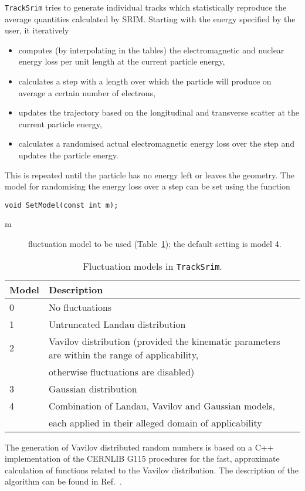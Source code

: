 \texttt{TrackSrim} tries to generate individual tracks which statistically 
reproduce the average quantities calculated by SRIM.
Starting with the energy specified by the user, it iteratively
\begin{itemize}
\item
computes (by interpolating in the tables)  
the electromagnetic and nuclear energy loss per unit length at the 
current particle energy,
\item
calculates a step with a length over which the particle will 
produce on average a certain number of electrons,
\item
updates the trajectory based on the longitudinal and transverse scatter 
at the current particle energy,
\item 
calculates a randomised actual electromagnetic energy loss over the step 
and updates the particle energy.
\end{itemize}
This is repeated until the particle has no energy left or leaves the geometry.
The model for randomising the energy loss over a step can be set using 
the function 
\begin{lstlisting}
void SetModel(const int m);
\end{lstlisting}
\begin{description}
\item[m] fluctuation model to be used (Table~\ref{Tab:SrimFluctuationModels}); the default setting is model 4.
\end{description}
\begin{table}
  \centering
  \caption{Fluctuation models in \texttt{TrackSrim}.}
  \label{Tab:SrimFluctuationModels}
  \begin{tabular}{l l}
    \toprule
    Model & Description \\
    \midrule
    0 & No fluctuations \\
    1 & Untruncated Landau distribution \\
    2 & Vavilov distribution (provided the kinematic parameters are within the range of applicability, \\
      & otherwise fluctuations are disabled) \\
    3 & Gaussian distribution \\
    4 & Combination of Landau, Vavilov and Gaussian models, \\
      & each applied in their alleged domain of applicability \\
    \bottomrule
  \end{tabular}
\end{table}
The generation of Vavilov distributed random numbers is based on a 
C++ implementation of the CERNLIB G115 procedures for the 
fast, approximate calculation of functions related to the 
Vavilov distribution. The description of the algorithm can be found 
in Ref.~\cite{RotondiMontagna1990}.

